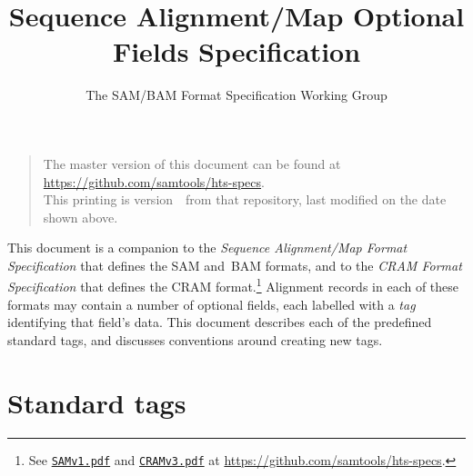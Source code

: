 \documentclass[10pt]{article}
\begin{document}

\title{Sequence Alignment/Map Optional Fields Specification}
\author{The SAM/BAM Format Specification Working Group}
\date{\headdate}
\maketitle
\begin{quote}\small
The master version of this document can be found at
\url{https://github.com/samtools/hts-specs}.\\
This printing is version~\commitdesc\ from that repository,
last modified on the date shown above.
\end{quote}
\vspace*{1em}

\noindent
This document is a companion to the {\sl Sequence Alignment/Map Format
Specification} that defines the SAM and~BAM formats, and to the {\sl CRAM
Format Specification} that defines the CRAM format.\footnote{See
\href{http://samtools.github.io/hts-specs/SAMv1.pdf}{\tt SAMv1.pdf} and
\href{http://samtools.github.io/hts-specs/CRAMv3.pdf}{\tt CRAMv3.pdf}
at \url{https://github.com/samtools/hts-specs}.}
Alignment records in each of these formats may contain a number of optional
fields, each labelled with a {\it tag\/} identifying that field's data.
This document describes each of the predefined standard tags, and discusses
conventions around creating new tags.

\section{Standard tags}
\end{document}
